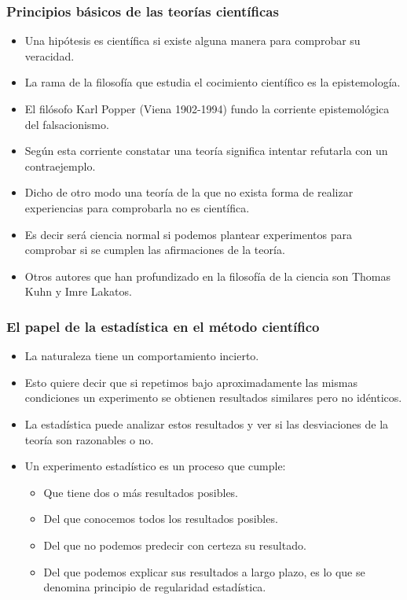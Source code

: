 \begin{frame}
\frametitle{Principios básicos de las teorías científicas}
\begin{itemize}
\item Una hipótesis es científica si existe alguna manera para comprobar su veracidad.
\item La rama de la filosofía que estudia el cocimiento científico es la epistemología.
\item El filósofo Karl Popper (Viena 1902-1994) fundo la corriente epistemológica del falsacionismo.
\item Según esta corriente  constatar una teoría  significa intentar refutarla con un contraejemplo.
\end{itemize}
\end{frame}

\begin{frame}
\begin{itemize}
\item Dicho de otro modo una teoría de la que no exista forma de realizar experiencias para comprobarla no es científica.
\item Es decir será ciencia normal si podemos plantear experimentos para comprobar si se cumplen las afirmaciones de la teoría.
\item Otros autores que han profundizado en la filosofía de la ciencia son Thomas Kuhn y Imre Lakatos.
\end{itemize}
\end{frame}



\begin{frame}
\frametitle{El papel de la estadística en el método científico}
\begin{itemize}
\item La naturaleza tiene un comportamiento incierto.
\item Esto quiere decir que si repetimos bajo aproximadamente las mismas condiciones un experimento se obtienen resultados similares pero no idénticos.
\item La estadística puede analizar estos resultados y ver si las desviaciones de la teoría son razonables o no.
\item Un experimento estadístico es un proceso que cumple:
\begin{itemize}
\item Que tiene dos o más resultados posibles.
\item Del que conocemos todos los resultados posibles.
\item Del que no podemos predecir con certeza su resultado.
\item Del que podemos explicar sus resultados a largo plazo, es lo que se denomina principio de regularidad estadística.
\end{itemize}
\end{itemize}
\end{frame}

